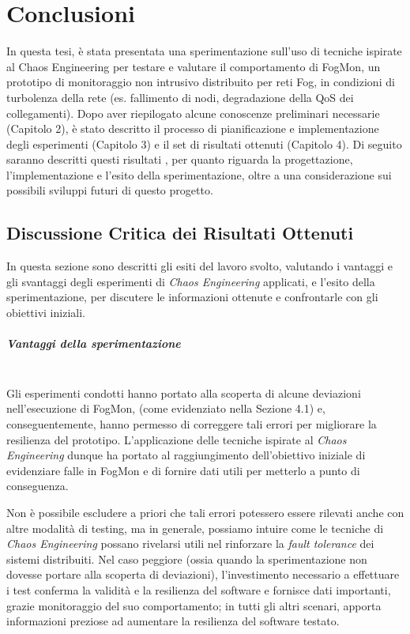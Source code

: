 \chapter{Conclusioni}
In questa tesi, è stata presentata una sperimentazione sull’uso di tecniche ispirate al Chaos Engineering per testare e valutare il comportamento di FogMon, un prototipo di monitoraggio non intrusivo distribuito per reti Fog, in condizioni di turbolenza della rete (es. fallimento di nodi, degradazione della QoS dei collegamenti). Dopo aver riepilogato alcune conoscenze preliminari necessarie (Capitolo 2), è stato descritto il processo di pianificazione e implementazione degli esperimenti (Capitolo 3) e il set di risultati ottenuti (Capitolo 4).
Di seguito saranno descritti questi risultati , per quanto riguarda la progettazione, l'implementazione e l'esito della sperimentazione, oltre a una considerazione sui possibili sviluppi futuri di questo progetto.
    
    \section{Discussione Critica dei Risultati Ottenuti}
    In questa sezione sono descritti gli esiti del lavoro svolto, valutando i vantaggi e gli svantaggi degli esperimenti di \textit{Chaos Engineering} applicati, e l'esito della sperimentazione, per discutere le informazioni ottenute e confrontarle con gli obiettivi iniziali.
        
        \paragraph{Vantaggi della sperimentazione}\mbox{}\\
            
        Gli esperimenti condotti hanno portato alla scoperta di alcune deviazioni nell'esecuzione di FogMon, (come evidenziato nella Sezione 4.1) e, conseguentemente, hanno permesso di correggere tali errori per migliorare la resilienza del prototipo. L'applicazione delle tecniche ispirate al \textit{Chaos Engineering} dunque ha portato al raggiungimento dell'obiettivo iniziale di evidenziare falle in FogMon e di fornire dati utili per metterlo a punto di conseguenza.
        
        Non è possibile escludere a priori che tali errori potessero essere rilevati anche con altre modalità di testing, ma in generale, possiamo intuire come le tecniche di \textit{Chaos Engineering} possano rivelarsi utili nel rinforzare la \textit{fault tolerance} dei sistemi distribuiti. Nel caso peggiore (ossia quando la sperimentazione non dovesse portare alla scoperta di deviazioni), l'investimento necessario a effettuare i test conferma la validità e la resilienza del software e fornisce dati importanti, grazie monitoraggio del suo comportamento; in tutti gli altri scenari, apporta informazioni preziose ad aumentare la resilienza del software testato.
        
